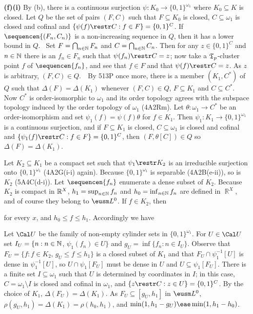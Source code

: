 {{\bf (f)(i)} By (b), there is a continuous surjection
$\psi:K_0\to\{0,1\}^{\omega_1}$ where $K_0\subseteq K$ is closed.
Let $Q$ be the set of pairs $(F,C)$ such that $F\subseteq K_0$ is
closed, $C\subseteq\omega_1$ is closed and cofinal and
$\{\psi(f)\restr C:f\in F\}=\{0,1\}^C$.   If $\sequencen{(F_n,C_n)}$ is
a non-increasing sequence in $Q$, then it has a lower bound in $Q$.
\Prf\ Set $F=\bigcap_{n\in\Bbb N}F_n$ and $C=\bigcap_{n\in\Bbb N}C_n$.
Then for any $z\in\{0,1\}^C$ and $n\in\Bbb N$ there is an $f_n\in F_n$
such that $\psi(f_n)\restr C=z$;  now take a $\frak T_p$-cluster point
$f$ of $\sequencen{f_n}$, and see that $f\in F$ and that
$\psi(f)\restr C=z$.  As $z$ is arbitrary, $(F,C)\in Q$.\ \QeD\
By 513P once more, there is a member $(K_1,C^*)$ of $Q$
such that $\Delta(F)=\Delta(K_1)$ whenever $(F,C)\in Q$,
$F\subseteq K_1$ and $C\subseteq C^*$.   Now $C^*$ is order-isomorphic
to $\omega_1$ and its order topology agrees with the subspace topology
induced by the order topology of $\omega_1$ (4A2Rm).   Let
$\theta:\omega_1\to C^*$ be an order-isomorphism and set
$\psi_1(f)=\psi(f)\theta$ for $f\in K_1$.   Then
$\psi_1:K_1\to\{0,1\}^{\omega_1}$ is a continuous surjection, and if
$F\subseteq K_1$ is closed, $C\subseteq\omega_1$ is closed and cofinal
and $\{\psi_1(f)\restr C:f\in F\}=\{0,1\}^C$, then $(F,\theta[C])\in Q$
so $\Delta(F)=\Delta(K_1)$.

\medskip

 Let $K_2\subseteq K_1$ be a compact set such that
$\psi_1\restr K_2$ is an irreducible surjection onto
$\{0,1\}^{\omega_1}$ (4A2G(i-i) again).
Because $\{0,1\}^{\omega_1}$ is separable
(4A2B(e-ii)), so is $K_2$ (5A4C(d-i)).   Let $\sequencen{f_n}$ enumerate a
dense subset of $K_2$.   Because $K_2$ is compact in $\Bbb R^X$,
$h_1=\sup_{n\in\Bbb N}f_n$ and $h_0=\inf_{n\in\Bbb N}f_n$ are defined in
$\BbbR^X$, and of course they belong to $\eusm L^0$.   If $f\in K_2$,
then


\noindent for every $x$, and $h_0\le f\le h_1$.   Accordingly we have


Let $\Cal U$ be the family of
non-empty cylinder sets in $\{0,1\}^{\omega_1}$.   For $U\in\Cal U$ set
$I_U=\{n:n\in\Bbb N$, $\psi_1(f_n)\in U\}$ and
$g_U=\inf\{f_n:n\in I_U\}$.   Observe that
$F_U=\{f:f\in K_2$, $g_U\le f\le h_1\}$ is a closed subset of $K_1$ and
that $F_U\cap\psi_1^{-1}[U]$ is dense in $\psi_1^{-1}[U]$, so
$U\cap\psi_1[F_U]$ must be dense in $U$ and $U\subseteq\psi_1[F_U]$.
There is a finite set $I\subseteq\omega_1$ such that $U$ is determined
by coordinates in $I$;  in this case, $C=\omega_1\setminus I$ is closed
and cofinal in $\omega_1$, and $\{z\restr C:z\in U\}=\{0,1\}^C$.   By
the choice of $K_1$, $\Delta(F_U)=\Delta(K_1)$.   As
$F_U\subseteq[g_U,h_1]$ in $\eusm L^0$,
$\rho(g_U,h_1)=\Delta(K_1)=\rho(h_0,h_1)$, and
$\min(1,h_1-g_U)\eae\min(1,h_1-h_0)$.

}
